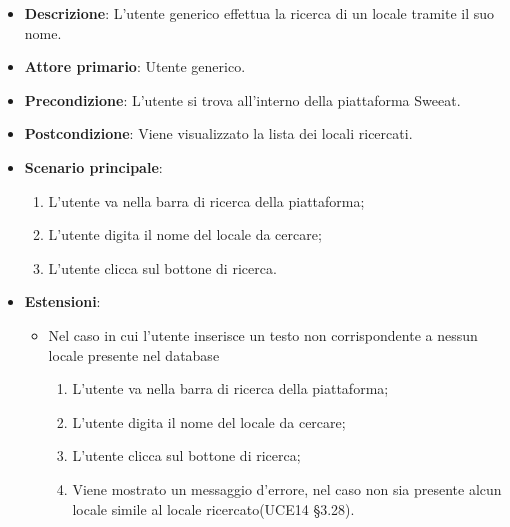 \begin{itemize}
    \item \textbf{Descrizione}: L'utente generico effettua la ricerca di un locale tramite il suo nome.
    \item \textbf{Attore primario}: Utente generico.
    \item \textbf{Precondizione}: L'utente si trova all’interno della piattaforma Sweeat.
    \item \textbf{Postcondizione}: Viene visualizzato la lista dei locali ricercati.
    \item \textbf{Scenario principale}: 
    \begin{enumerate}
        \item L’utente va nella barra di ricerca della piattaforma;
        \item L’utente digita il nome del locale da cercare;
        \item L’utente clicca sul bottone di ricerca.
    \end{enumerate}
    \item \textbf{Estensioni}:
    \begin{itemize}
        \item Nel caso in cui l’utente inserisce un testo non corrispondente a nessun locale presente nel database
	\begin{enumerate}  
		\item L’utente va nella barra di ricerca della piattaforma;
        \item L’utente digita il nome del locale da cercare;
        \item L’utente clicca sul bottone di ricerca; 
        \item Viene mostrato un messaggio d'errore, nel caso non sia presente alcun locale simile al locale ricercato(UCE14 §3.28).
    \end{enumerate}
    \end{itemize}    
\end{itemize}

